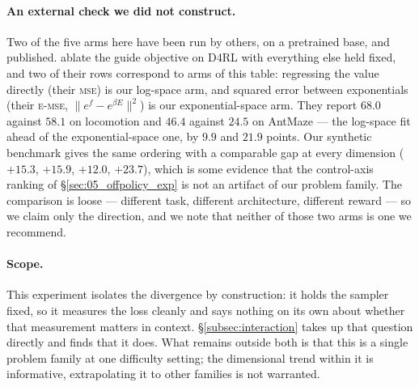 \paragraph{An external check we did not construct.}
Two of the five arms here have been run by others, on a pretrained base, and
published. \citet{lu2023qgpo} ablate the guide objective on D4RL with
everything else held fixed, and two of their rows correspond to arms of this
table: regressing the value directly (their \textsc{mse}) is our log-space
arm, and squared error between exponentials (their \textsc{e-mse},
$\|e^{f}-e^{\beta E}\|^{2}$) is our exponential-space arm. They report $68.0$
against $58.1$ on locomotion and $46.4$ against $24.5$ on AntMaze --- the
log-space fit ahead of the exponential-space one, by $9.9$ and $21.9$ points.
Our synthetic benchmark gives the same ordering with a comparable gap at every
dimension ($+15.3$, $+15.9$, $+12.0$, $+23.7$), which is some evidence that the
control-axis ranking of \S\ref{sec:05_offpolicy_exp} is not an artifact of our
problem family. The comparison is loose --- different task, different
architecture, different reward --- so we claim only the direction, and we note
that neither of those two arms is one we recommend.

\paragraph{Scope.}
This experiment isolates the divergence by construction: it holds the sampler
fixed, so it measures the loss cleanly and says nothing on its own about
whether that measurement matters in context. \S\ref{subsec:interaction} takes
up that question directly and finds that it does. What remains outside both is
that this is a single problem family at one difficulty setting; the dimensional
trend within it is informative, extrapolating it to other families is not
warranted.
